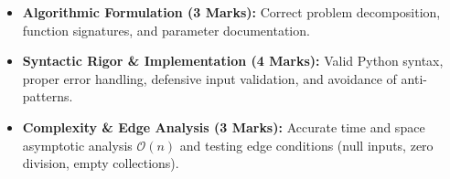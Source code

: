 \begin{examinertip}
\begin{itemize}[leftmargin=1.5em, itemsep=2pt]
    \item \textbf{Algorithmic Formulation (3 Marks):} Correct problem decomposition, function signatures, and parameter documentation.
    \item \textbf{Syntactic Rigor \& Implementation (4 Marks):} Valid Python syntax, proper error handling, defensive input validation, and avoidance of anti-patterns.
    \item \textbf{Complexity \& Edge Analysis (3 Marks):} Accurate time and space asymptotic analysis $\mathcal{O}(n)$ and testing edge conditions (null inputs, zero division, empty collections).
\end{itemize}
\end{examinertip}
